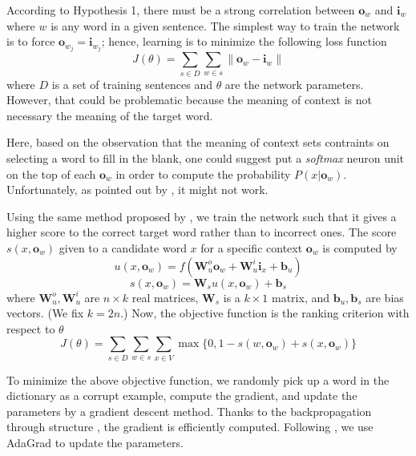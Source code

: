\documentclass[11pt]{article}
\begin{document}
According to Hypothesis 1, there must be a strong correlation 
between $\mathbf{o}_{w}$ and $\mathbf{i}_{w}$ where $w$ is any word in 
a given sentence. The simplest way to train the network is to force 
$\mathbf{o}_{w_j} = \mathbf{i}_{w_j}$; hence, learning is to minimize the following 
loss function
\begin{equation}
	J(\theta) = \sum_{s \in D} \sum_{w \in s} \| \mathbf{o}_{w} - \mathbf{i}_{w} \|
\end{equation}
where $D$ is a set of training sentences and $\theta$ are the network parameters. 
However, that could be problematic because 
the meaning of context is not necessary the meaning of the target word.

Here, based on the observation that the meaning of context sets contraints on 
selecting a word to fill in the blank, one could suggest put a \textit{softmax} neuron 
unit on the top of each $\mathbf{o}_w$ in order to compute the probability $P(x|\mathbf{o}_w)$. 
Unfortunately, as pointed out by \cite{collobert_natural_2011}, it might not work. 

Using the same method proposed by \cite{collobert_natural_2011}, we train the network 
such that it gives a higher score to the correct target word rather than to incorrect ones. 
The score $s(x,\mathbf{o}_w)$ given to a candidate word $x$ for a specific context 
$\mathbf{o}_w$ is computed by 
\begin{equation}
	u(x,\mathbf{o}_w) = f(\mathbf{W}_u^o \mathbf{o}_w + \mathbf{W}_u^i \mathbf{i}_x + \mathbf{b}_u) 
\end{equation}
\begin{equation}
	\label{equation score}
	s(x,\mathbf{o}_w) = \mathbf{W}_s u(x,\mathbf{o}_w) + \mathbf{b}_s
\end{equation}
where $\mathbf{W}_u^o,\mathbf{W}_u^i$ are $n \times k$ real matrices, $ \mathbf{W}_s$ is 
a $k \times 1$ matrix, and $\mathbf{b}_u, \mathbf{b}_s$ are bias vectors. (We fix $k=2n$.) 
Now, the objective function is the ranking criterion with respect to $\theta$
\begin{equation}
	J(\theta) = \sum_{s \in D} \sum_{w \in s} \sum_{x \in V} \max \{0, 1 - s(w,\mathbf{o}_w) + s(x,\mathbf{o}_w) \}
\end{equation}

To minimize the above objective function, we randomly pick up a word 
in the dictionary as a corrupt example, compute the gradient, and update 
the parameters by a gradient descent method. Thanks to the backpropagation 
through structure \cite{goller_learning_1996}, the gradient is efficiently computed. 
Following \cite{socher2013recursive}, we use AdaGrad \cite{duchi2011adaptive}
to update the parameters.
\end{document}
